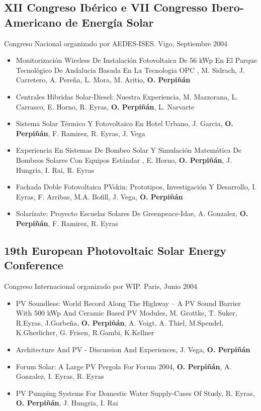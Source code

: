 \documentclass[article, a4paper]{memoir}
\begin{document}
\subsection{XII Congreso Ibérico e VII Congresso Ibero-Americano de Energía Solar}
\label{sec:org666b6fd}
Congreso Nacional organizado por AEDES-ISES. Vigo, Septiembre 2004

\begin{itemize}
\item Monitorización Wireless De Instalación Fotovoltaica De 56 kWp En El Parque Tecnológico De Andalucia Basada En La Tecnologia OPC , M. Sidrach, J. Carretero, A. Pereña, L. Mora, M. Aritio, \textbf{O. Perpiñán}

\item Centrales Hibridas Solar-Diesel: Nuestra Experiencia, M. Mazzorana, L. Carrasco, E. Horno, R. Eyras, \textbf{O. Perpiñán}, L.  Narvarte

\item Sistema Solar Térmico Y Fotovoltaico En Hotel Urbano, J. Garcia, \textbf{O. Perpiñán}, F. Ramirez, R. Eyras, J. Vega

\item Experiencia En Sistemas De Bombeo Solar Y Simulación Matemática De Bombeos Solares Con Equipos Estándar , E. Horno, \textbf{O. Perpiñán}, J. Hungria, I. Rai, R. Eyras

\item Fachada Doble Fotovoltaica PVskin: Prototipos, Investigación Y Desarrollo, I. Eyras, F. Arribas, M.A. Bofill, J. Vega, \textbf{O. Perpiñán}

\item Solarízate: Proyecto Escuelas Solares De Greenpeace-Idae, A. Gonzalez, \textbf{O. Perpiñán}, F. Ramirez, R. Eyras
\end{itemize}

\subsection{19th European Photovoltaic Solar Energy Conference}
\label{sec:org8c3450f}
Congreso Internacional organizado por WIP. Paris, Junio 2004

\begin{itemize}
\item PV Soundless: World Record Along The Highway -- A PV Sound Barrier With 500 kWp And Ceramic Based PV Modules, M. Grottke, T. Suker, R.Eyras, J.Gorbeña, \textbf{O. Perpiñán}, A. Voigt, A.  Thiel, M.Spendel, K.Gherlicher, G. Frisen, R.Gambi, K.Kellner

\item Architecture And PV - Discussion And Experiences, J. Vega, \textbf{O. Perpiñán}

\item Forum Solar: A Large PV Pergola For Forum 2004, \textbf{O. Perpiñán}, A. Gonzalez, I. Eyras, R. Eyras

\item PV Pumping Systems For Domestic Water Supply-Cases Of Study, R. Eyras, \textbf{O. Perpiñán}, J. Hungria, I. Rai
\end{itemize}
\end{document}
